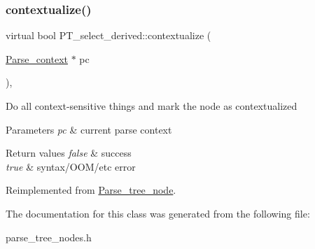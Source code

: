 \subsubsection{\texorpdfstring{contextualize()}{contextualize()}}
{\footnotesize\ttfamily virtual bool P\+T\+\_\+select\+\_\+derived\+::contextualize (\begin{DoxyParamCaption}\item[{\mbox{\hyperlink{structParse__context}{Parse\+\_\+context}} $\ast$}]{pc }\end{DoxyParamCaption})\hspace{0.3cm}{\ttfamily [inline]}, {\ttfamily [virtual]}}

Do all context-\/sensitive things and mark the node as contextualized


\begin{DoxyParams}{Parameters}
{\em pc} & current parse context\\
\hline
\end{DoxyParams}

\begin{DoxyRetVals}{Return values}
{\em false} & success \\
\hline
{\em true} & syntax/\+O\+O\+M/etc error \\
\hline
\end{DoxyRetVals}


Reimplemented from \mbox{\hyperlink{classParse__tree__node_a22d93524a537d0df652d7efa144f23da}{Parse\+\_\+tree\+\_\+node}}.



The documentation for this class was generated from the following file\+:\begin{DoxyCompactItemize}
\item 
parse\+\_\+tree\+\_\+nodes.\+h\end{DoxyCompactItemize}
